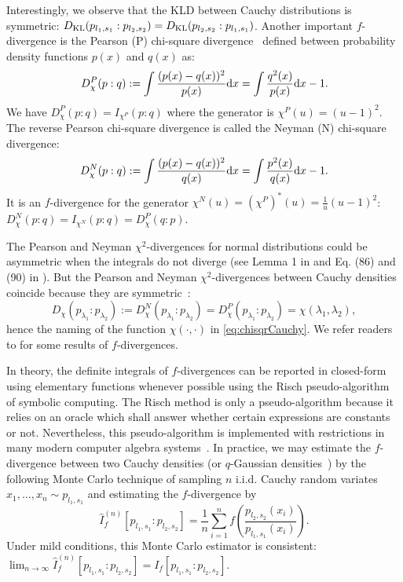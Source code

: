 \documentclass[journal]{IEEEtran}
\begin{document}
Interestingly, we observe that the KLD between Cauchy distributions is symmetric: $D_{\mathrm{KL}}(p_{l_1,s_1}:p_{l_2,s_2}) =D_{\mathrm{KL}}(p_{l_2,s_2}:p_{l_1,s_1})$.
Another important $f$-divergence is the Pearson (P) chi-square divergence~\cite{CT-2012} defined between probability density functions $p(x)$ and $q(x)$ as:
$$
D_\chi^P(p:q):=\int \frac{(p(x)-q(x))^2}{p(x)}\mathrm{d}x=\int \frac{q^2(x)}{p(x)}\mathrm{d}x  -1.
$$
We have $D_\chi^P(p:q)=I_{\chi^P}(p:q)$ where the generator is $\chi^P(u)=(u-1)^2$. 
The reverse Pearson chi-square divergence is called the Neyman (N) chi-square divergence:
$$
D_\chi^N(p:q):=\int \frac{(p(x)-q(x))^2}{q(x)}\mathrm{d}x=\int \frac{p^2(x)}{q(x)}\mathrm{d}x  -1.
$$ 
It is an $f$-divergence for the generator $\chi^N(u)=(\chi^P)^*(u)=\frac{1}{u}(u-1)^2$: $D_\chi^N(p:q)=I_{\chi^N}(p:q)=D_\chi^P(q:p)$. 

The Pearson and Neyman $\chi^2$-divergences for normal distributions could be asymmetric when the integrals do not diverge (see Lemma 1 in \cite{fdivchi-2013} and Eq. (86) and (90) in \cite{JSMeans-2019}). 
But the Pearson and Neyman  $\chi^2$-divergences between Cauchy densities coincide because they are symmetric~\cite{CauchyVoronoi-2020}:
$$
D_\chi(p_{\lambda_1}:p_{\lambda_2}):= D_\chi^N(p_{\lambda_1}:p_{\lambda_2})=D_\chi^{P} (p_{\lambda_1}:p_{\lambda_2})=\chi(\lambda_1,\lambda_2), 
$$
hence the naming of the function $\chi(\cdot,\cdot)$ in \eqref{eq:chisqrCauchy}. 
We refer readers to \cite{Liese2006, Sason2016, Collet2019} for some results of $f$-divergences.


In theory, the definite integrals of $f$-divergences can be reported in closed-form using elementary functions whenever possible using the Risch pseudo-algorithm~\cite{risch1969problem} of symbolic computing. 
The Risch method is only a pseudo-algorithm because it relies on an oracle which shall answer whether certain expressions are constants or not. Nevertheless, this pseudo-algorithm is implemented with restrictions in many modern computer algebra systems~\cite{bronstein2005symbolic}. 
In practice, we may estimate the $f$-divergence between two Cauchy densities (or $q$-Gaussian densities~\cite{nelson2021comments}) by the following Monte Carlo technique of sampling $n$ i.i.d. Cauchy random variates $x_1,\ldots, x_n \sim p_{l_1,s_1}$ and estimating the $f$-divergence by
$$
\hat I_f^{(n)}[p_{l_1,s_1}:p_{l_2,s_2}]=\frac{1}{n}\sum_{i=1}^n f\left(\frac{p_{l_2,s_2}(x_i)}{p_{l_1,s_1}(x_i)}\right).
$$
Under mild conditions, this Monte Carlo estimator is consistent: $\displaystyle\lim_{n\rightarrow\infty}\hat I_f^{(n)}[p_{l_1,s_1}:p_{l_2,s_2}]=I_f[p_{l_1,s_1}:p_{l_2,s_2}]$.
\end{document}
